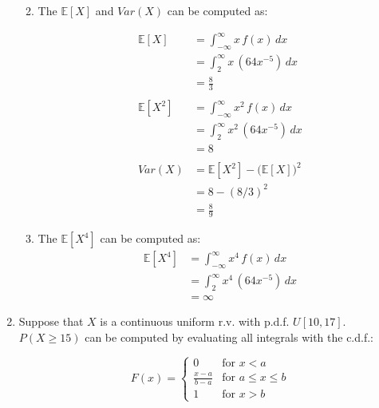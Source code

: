 \documentclass{article}
\begin{document}
\begin{enumerate}
\begin{enumerate}
\newpage
        \item The $\mathbb{E}{[X]}$ and $Var(X)$ can be computed as:
        
        \begin{equation}
            \begin{split}
            \mathbb{E}{[X]} & = \int_{-\infty}^{\infty}x \,f(x) \, dx \\
            &= \int_{2}^{\infty} x \, (64x^{-5}) \, dx \\
            &= \frac{8}{3}\\~\\
            \mathbb{E}{[X^{2}]} & = \int_{-\infty}^{\infty}x^{2} \,f(x) \, dx \\
            &= \int_{2}^{\infty} x^{2} \, (64x^{-5}) \, dx \\
            &= 8\\~\\
            Var(X) &= \mathbb{E}{[X^2]} - (\mathbb{E}{[X])^2}\\
            &= 8 - (8/3)^2\\
            &= \frac{8}{9}
            \end{split}
        \end{equation}
        
        \item The $\mathbb{E}{[X^4]}$ can be computed as:
        \begin{equation}
            \begin{split}
            \mathbb{E}{[X^{4}]} & = \int_{-\infty}^{\infty}x^{4} \,f(x) \, dx \\
            &= \int_{2}^{\infty} x^{4} \, (64x^{-5}) \, dx \\
            &= \infty
            \end{split}
        \end{equation}
    \end{enumerate}

    \item Suppose that $X$ is a continuous uniform r.v. with p.d.f. $U[10, 17]$. $P(X \geq 15)$ can be computed by evaluating all integrals with the c.d.f.:

    \begin{equation}
        F(x) = \begin{cases}
        0 & \text{for } x < a\\
        \frac{x -a }{b - a} & \text{for } a \leq x \leq b\\
        1 & \text{for } x > b
        \end{cases}
    \end{equation}


\end{enumerate}
\end{document}
